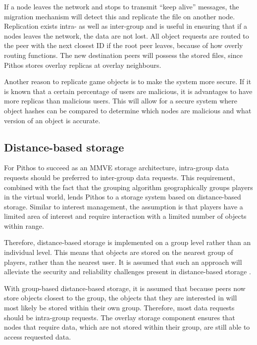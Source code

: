 \documentclass[10pt,a4paper,conference]{IEEEtran}
\begin{document}
If a node leaves the network and stops to transmit ``keep alive'' messages, the migration mechanism will detect this and replicate the file on
another node. Replication exists intra- as well as inter-group and is useful in ensuring that if a nodes leaves the network, the data are not lost.
All object requests are routed to the peer with the next closest ID if the root peer leaves, because of how overly routing functions. The new
destination peers will possess the stored files, since Pithos stores overlay replicas at overlay neighbours.

Another reason to replicate game objects is to make the system more secure. If it is known that a certain percentage of users are malicious, it is
advantages to have more replicas than malicious users. This will allow for a secure system where object hashes can be compared to determine which
nodes are malicious and what version of an object is accurate.

\subsection{Distance-based storage}
\label{distance_based}

For Pithos to succeed as an MMVE storage architecture, intra-group data requests should be preferred to inter-group data requests. This requirement,
combined with the fact that the grouping algorithm geographically groups players in the virtual world, lends Pithos to a storage system based on
distance-based storage. Similar to interest management, the assumption is that players have a limited area of interest and require interaction with a
limited number of objects within range.

Therefore, distance-based storage is implemented on a group level rather than an individual level. This means that objects are stored on the nearest
group of players, rather than the nearest user. It is assumed that such an approach will alleviate the security and reliability challenges present in
distance-based storage \cite{gilmore_p2p_mmog_state_persistency}.

With group-based distance-based storage, it is assumed that because peers now store objects closest to the group, the objects that they are
interested in will most likely be stored within their own group. Therefore, most data requests should be intra-group requests. The overlay storage
component ensures that nodes that require data, which are not stored within their group, are still able to access requested data.
\end{document}
